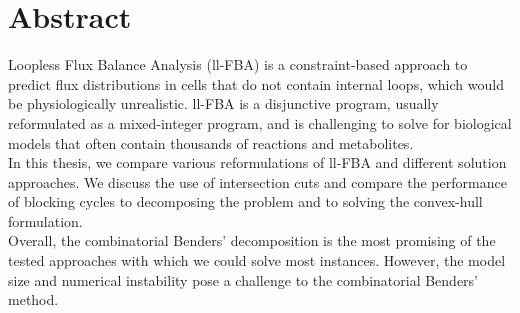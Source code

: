 \newpage
\section*{\centering Abstract}

Loopless Flux Balance Analysis (ll-FBA) is a constraint-based approach to predict flux distributions in cells that do not contain internal loops, which would be physiologically unrealistic.
ll-FBA is a disjunctive program, usually reformulated as a mixed-integer program, and is challenging to solve for biological models that often contain thousands of reactions and metabolites. \\
In this thesis, we compare various reformulations of ll-FBA and different solution approaches. We discuss the use of intersection cuts and compare the performance of blocking cycles to decomposing the problem and to solving the convex-hull formulation.\\
Overall, the combinatorial Benders' decomposition is the most promising of the tested approaches with which we could solve most instances. However, the model size and numerical instability pose a challenge to the combinatorial Benders' method.